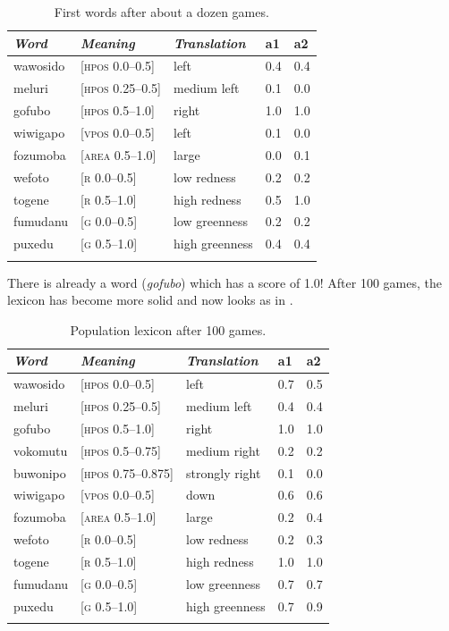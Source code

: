 \begin{table}
\begin{center}
\begin{tabular}{lllll}
\lsptoprule
{\itshape Word}&{\itshape Meaning}&{\itshape Translation} & {\bfshape a1}&{\bfshape a2} \\ \midrule
wawosido & [\textsc{hpos} 0.0–0.5] &left&0.4&0.4\\ 
meluri & [\textsc{hpos} 0.25–0.5] &medium left&0.1&0.0\\ 
gofubo & [\textsc{hpos} 0.5–1.0]& right&1.0&1.0\\ 
wiwigapo & [\textsc{vpos} 0.0–0.5] &left&0.1&0.0\\ 
fozumoba & [\textsc{area} 0.5–1.0]&large & 0.0&0.1\\ 
wefoto & [\textsc{r} 0.0–0.5]& low redness &0.2&0.2\\ 
togene & [\textsc{r} 0.5–1.0]& high redness &0.5&1.0\\ 
fumudanu & [\textsc{g} 0.0–0.5]& low greenness &0.2&0.2\\ 
puxedu & [\textsc{g} 0.5–1.0]& high greenness &0.4&0.4\\ 
\lspbottomrule
\end{tabular}
\caption{\label{tab:game50}First words after about a dozen games.}
\end{center}
\end{table}

There is already a word (\textit{gofubo}) which has
a score of 1.0! After 100 games, the lexicon has become more 
solid and now looks as in .    


\begin{table}
\begin{center}
\begin{tabular}{lllll}
\lsptoprule
{\itshape Word}&{\itshape Meaning}&{\itshape Translation} & {\bfshape a1}&{\bfshape a2} \\ \midrule
wawosido & [\textsc{hpos} 0.0–0.5] &left&0.7&0.5\\ 
meluri & [\textsc{hpos} 0.25–0.5] &medium left&0.4&0.4\\ 
gofubo & [\textsc{hpos} 0.5–1.0]& right&1.0&1.0\\ 
vokomutu & [\textsc{hpos} 0.5–0.75] &medium right&0.2&0.2\\ 
buwonipo & [\textsc{hpos} 0.75–0.875] &strongly right&0.1&0.0\\ 
wiwigapo & [\textsc{vpos} 0.0–0.5] &down&0.6&0.6\\ 
fozumoba & [\textsc{area} 0.5–1.0]&large & 0.2&0.4\\ 
wefoto & [\textsc{r} 0.0–0.5]& low redness &0.2&0.3\\ 
togene & [\textsc{r} 0.5–1.0]& high redness &1.0&1.0\\ 
fumudanu & [\textsc{g} 0.0–0.5]& low greenness &0.7&0.7\\ 
puxedu & [\textsc{g} 0.5–1.0]& high greenness &0.7&0.9\\ 
\lspbottomrule
\end{tabular}
\caption{\label{tab:goubo}Population lexicon after 100 games.}
\end{center}
\end{table}


